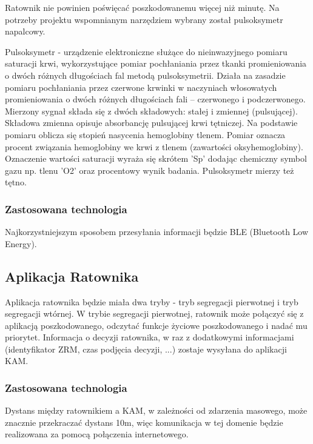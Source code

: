 \documentclass[11pt]{report}
\begin{document}
Ratownik nie powinien poświęcać poszkodowanemu więcej niż minutę. Na potrzeby projektu wspomnianym narzędziem wybrany został pulsoksymetr napalcowy.
 
Pulsoksymetr - urządzenie elektroniczne służące do nieinwazyjnego pomiaru saturacji krwi, wykorzystujące pomiar pochłaniania przez tkanki promieniowania 
o dwóch różnych długościach fal metodą pulsoksymetrii. Działa na zasadzie pomiaru pochłaniania przez czerwone krwinki w naczyniach włosowatych promieniowania o dwóch różnych długościach fali – czerwonego i podczerwonego. Mierzony sygnał składa się z dwóch składowych: stałej i zmiennej (pulsującej). Składowa zmienna opisuje absorbancję pulsującej krwi tętniczej. Na podstawie pomiaru oblicza się stopień nasycenia hemoglobiny tlenem. Pomiar oznacza procent związania hemoglobiny we krwi z tlenem (zawartości oksyhemoglobiny). Oznaczenie wartości saturacji wyraża się skrótem 'Sp' dodając chemiczny symbol gazu np. tlenu 'O2' oraz procentowy wynik badania. Pulsoksymetr mierzy też tętno.

\subsubsection{Zastosowana technologia}
Najkorzystniejszym sposobem przesyłania informacji będzie BLE (Bluetooth Low Energy).


\subsection{Aplikacja Ratownika}
Aplikacja ratownika będzie miała dwa tryby - tryb segregacji pierwotnej i tryb segregacji wtórnej. W trybie segregacji pierwotnej, ratownik może połączyć się z aplikacją poszkodowanego, odczytać funkcje życiowe poszkodowanego i nadać mu priorytet. Informacja o decyzji ratownika, w raz z dodatkowymi informacjami (identyfikator ZRM, czas podjęcia decyzji, ...) zostaje wysyłana do aplikacji KAM. 
\subsubsection{Zastosowana technologia}

Dystans między ratownikiem a KAM, w zależności od zdarzenia masowego, może znacznie przekraczać dystans 10m, więc komunikacja w tej domenie będzie realizowana za pomocą połączenia internetowego.
\\
\noindent 

\newpage
\end{document}
